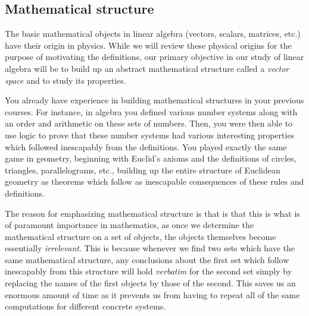 \documentclass[12pt,letterpaper,reqno]{article}
\numberwithin{equation}{section}
\newcommand{\ti}[1]{\textit{#1}}
\begin{document}
\subsection{Mathematical structure}
The basic mathematical objects in linear algebra (vectors, scalars, matrices, etc.) have their origin in physics. While we will review these physical origins for the purpose of motivating the definitions, our primary objective in our study of linear algebra will be to build up an abstract mathematical structure called a \ti{vector space} and to study its properties. 

You already have experience in building mathematical structures in your previous courses. For instance, in algebra you defined various number systems along with an order and arithmetic on these sets of numbers. Then, you were then able to use logic to prove that these number systems had various interesting properties which followed inescapably from the definitions. You played exactly the same game in geometry, beginning with Euclid's axioms and the definitions of circles, triangles, parallelograms, etc., building up the entire structure of Euclidean geometry as theorems which follow as inescapable consequences of these rules and definitions.

The reason for emphasizing mathematical structure is that is that this is what is of paramount importance in mathematics, as once we determine the mathematical structure on a set of objects, the objects themselves become essentially \ti{irrelevant}. This is because whenever we find two sets which have the same mathematical structure, any conclusions about the first set which follow inescapably from this structure will hold \ti{verbatim} for the second set simply by replacing the names of the first objects by those of the second. This saves us an enormous amount of time as it prevents us from having to repeat all of the same computations for different concrete systems. 
\end{document}
